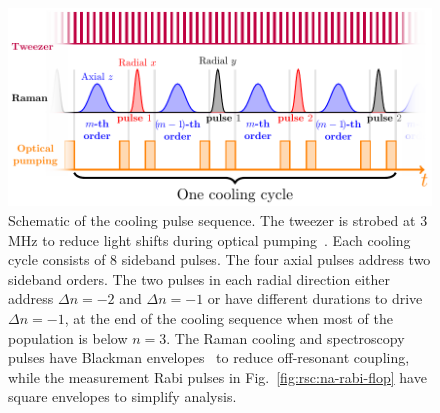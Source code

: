 \begin{figure}
  \centering
  \includegraphics[width=\textwidth]{figures/na_rsc_sequence.pdf}
  \caption[Simulation optimized Raman sideband cooling sequence for Sodium]{
    Schematic of the cooling pulse sequence. The tweezer is strobed at 3 MHz to
    reduce light shifts during optical pumping~\cite{hutzler_eliminating_2017}.
    Each cooling cycle consists of $8$ sideband pulses.
    The four axial pulses address two sideband orders.
    The two pulses in each radial direction either address $\Delta n=-2$ and $\Delta n=-1$
    or have different durations to drive $\Delta n=-1$,
    at the end of the cooling sequence when most of the population is below $n=3$.
    The Raman cooling and spectroscopy pulses have Blackman envelopes~\cite{kasevich_laser_1992}
    to reduce off-resonant coupling,
    while the measurement Rabi pulses in Fig.~\ref{fig:rsc:na-rabi-flop}
    have square envelopes to simplify analysis.
    \label{fig:rsc:na-sequence}}
\end{figure}

